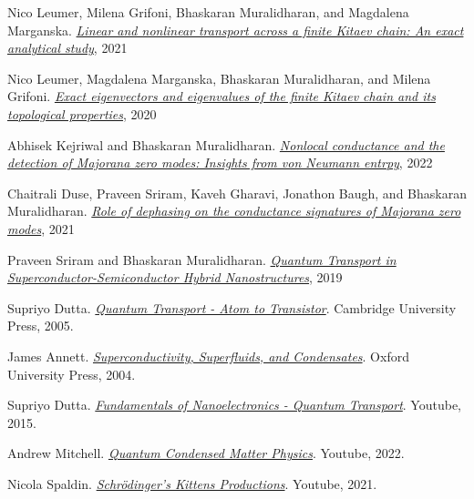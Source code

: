 \begin{thebibliography}{99} 

Nico Leumer, Milena Grifoni, Bhaskaran Muralidharan, and Magdalena Marganska.
 \href{https://doi.org/10.1103/PhysRevB.103.165432}{\textit{Linear and nonlinear transport across a finite Kitaev chain: An exact analytical study}}, 2021

Nico Leumer, Magdalena Marganska, Bhaskaran Muralidharan, and Milena Grifoni.
 \href{https://doi.org/10.1088/1361-648X/ab8bf9}{\textit{Exact eigenvectors and eigenvalues of the finite Kitaev chain and its topological properties}}, 2020

Abhisek Kejriwal and Bhaskaran Muralidharan.
 \href{https://doi.org/10.1103/PhysRevB.105.L161403}{\textit{Nonlocal conductance and the detection of Majorana zero modes: Insights from von Neumann entrpy}}, 2022

Chaitrali Duse, Praveen Sriram, Kaveh Gharavi, Jonathon Baugh, and Bhaskaran Muralidharan.
 \href{https://doi.org/10.1088/1361-648X/ac0d16}{\textit{Role of dephasing on the conductance signatures of Majorana zero modes}}, 2021

Praveen Sriram and Bhaskaran Muralidharan.
 \href{https://doi.org/10.1103/PhysRevB.100.155431}{\textit{Quantum Transport in Superconductor-Semiconductor Hybrid Nanostructures}}, 2019

Supriyo Dutta.
 \href{https://www.cambridge.org/core/books/quantum-transport/E96BE74AACD59A03A7D6A7F7DACDFB71}{\textit{Quantum Transport - Atom to Transistor}}.
Cambridge University Press, 2005.

James Annett.
 \href{https://webuser.unicas.it/pagliarone/Super.pdf}{\textit{Superconductivity, Superfluids, and Condensates}}. 
Oxford University Press, 2004.

Supriyo Dutta.
 \href{https://www.youtube.com/watch?v=eg4krA0xH6I}{\textit{Fundamentals of Nanoelectronics - Quantum Transport}}.
Youtube, 2015.

Andrew Mitchell. 
 \href{https://www.youtube.com/playlist?list=PLotxEOxVaaoKRXdDN-7lI3Y88PaHqyOZL}{\textit{Quantum Condensed Matter Physics}}. 
Youtube, 2022.

Nicola Spaldin. 
 \href{https://www.youtube.com/playlist?list=PL8n8OkcK9SRZwL24mF7FeOa50Xd9YB-JO}{\textit{Schrödinger's Kittens Productions}}. Youtube, 2021.


\end{thebibliography}

